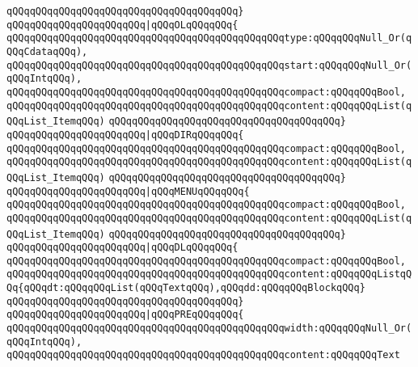 \verb|qQQqqQQqqQQqqQQqqQQqqQQqqQQqqQQqqQQqqQQq}|\newline
\verb|qQQqqQQqqQQqqQQqqQQqqQQq|\verb#|qQQqOLqQQqqQQq{#\newline
\verb|qQQqqQQqqQQqqQQqqQQqqQQqqQQqqQQqqQQqqQQqqQQqqQQqtype:qQQqqQQqNull_Or(qQQqCdataqQQq),|\newline
\verb|qQQqqQQqqQQqqQQqqQQqqQQqqQQqqQQqqQQqqQQqqQQqqQQqstart:qQQqqQQqNull_Or(qQQqIntqQQq),|\newline
\verb|qQQqqQQqqQQqqQQqqQQqqQQqqQQqqQQqqQQqqQQqqQQqqQQqcompact:qQQqqQQqBool,|\newline
\verb|qQQqqQQqqQQqqQQqqQQqqQQqqQQqqQQqqQQqqQQqqQQqqQQqcontent:qQQqqQQqList(qQQqList_ItemqQQq)|\newline
\verb|qQQqqQQqqQQqqQQqqQQqqQQqqQQqqQQqqQQqqQQq}|\newline
\verb|qQQqqQQqqQQqqQQqqQQqqQQq|\verb#|qQQqDIRqQQqqQQq{#\newline
\verb|qQQqqQQqqQQqqQQqqQQqqQQqqQQqqQQqqQQqqQQqqQQqqQQqcompact:qQQqqQQqBool,|\newline
\verb|qQQqqQQqqQQqqQQqqQQqqQQqqQQqqQQqqQQqqQQqqQQqqQQqcontent:qQQqqQQqList(qQQqList_ItemqQQq)|\newline
\verb|qQQqqQQqqQQqqQQqqQQqqQQqqQQqqQQqqQQqqQQq}|\newline
\verb|qQQqqQQqqQQqqQQqqQQqqQQq|\verb#|qQQqMENUqQQqqQQq{#\newline
\verb|qQQqqQQqqQQqqQQqqQQqqQQqqQQqqQQqqQQqqQQqqQQqqQQqcompact:qQQqqQQqBool,|\newline
\verb|qQQqqQQqqQQqqQQqqQQqqQQqqQQqqQQqqQQqqQQqqQQqqQQqcontent:qQQqqQQqList(qQQqList_ItemqQQq)|\newline
\verb|qQQqqQQqqQQqqQQqqQQqqQQqqQQqqQQqqQQqqQQq}|\newline
\verb|qQQqqQQqqQQqqQQqqQQqqQQq|\verb#|qQQqDLqQQqqQQq{#\newline
\verb|qQQqqQQqqQQqqQQqqQQqqQQqqQQqqQQqqQQqqQQqqQQqqQQqcompact:qQQqqQQqBool,|\newline
\verb|qQQqqQQqqQQqqQQqqQQqqQQqqQQqqQQqqQQqqQQqqQQqqQQqcontent:qQQqqQQqListqQQq{qQQqdt:qQQqqQQqList(qQQqTextqQQq),qQQqdd:qQQqqQQqBlockqQQq}|\newline
\verb|qQQqqQQqqQQqqQQqqQQqqQQqqQQqqQQqqQQqqQQq}|\newline
\verb|qQQqqQQqqQQqqQQqqQQqqQQq|\verb#|qQQqPREqQQqqQQq{#\newline
\verb|qQQqqQQqqQQqqQQqqQQqqQQqqQQqqQQqqQQqqQQqqQQqqQQqwidth:qQQqqQQqNull_Or(qQQqIntqQQq),|\newline
\verb|qQQqqQQqqQQqqQQqqQQqqQQqqQQqqQQqqQQqqQQqqQQqqQQqcontent:qQQqqQQqText|\newline
